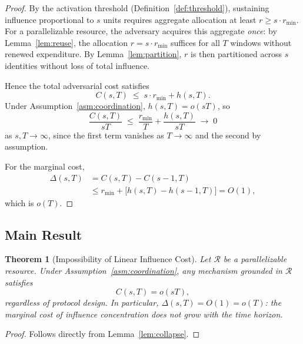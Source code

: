 \documentclass[10pt,journal,compsoc]{IEEEtran}
\newtheorem{theorem}{Theorem}[section]
\theoremstyle{remark}
\begin{document}
	\begin{proof}
		By the activation threshold (Definition~\ref{def:threshold}),
		sustaining influence proportional to $s$ units requires
		aggregate allocation at least $r \geq s \cdot r_{\min}$.
		For a parallelizable resource, the adversary acquires
		this aggregate \emph{once}: by
		Lemma~\ref{lem:reuse}, the allocation $r = s \cdot r_{\min}$
		suffices for all $T$ windows without renewed expenditure.
		By Lemma~\ref{lem:partition}, $r$ is then partitioned
		across $s$ identities without loss of total influence.
		
		Hence the total adversarial cost satisfies
		\begin{equation}
			C(s, T) \;\leq\; s \cdot r_{\min} + h(s, T).
		\end{equation}
		Under Assumption~\ref{asm:coordination},
		$h(s, T) = o(sT)$, so
		\begin{equation}
			\frac{C(s, T)}{sT}
			\;\leq\;
			\frac{r_{\min}}{T} + \frac{h(s, T)}{sT}
			\;\to\; 0
		\end{equation}
		as $s, T \to \infty$, since the first term vanishes as
		$T \to \infty$ and the second by assumption.
		
		For the marginal cost,
		\begin{align}
			\Delta(s, T)
			&= C(s,T) - C(s-1,T) \nonumber \\
			&\leq r_{\min} + \bigl[h(s,T) - h(s-1,T)\bigr]
			= O(1),
		\end{align}
		which is $o(T)$.
	\end{proof}
	
	\subsection{Main Result}
	\label{ssec:theorem_impossible}
	
	\begin{theorem}[Impossibility of Linear Influence Cost]
		\label{thm:impossible}
		Let $\mathcal{R}$ be a parallelizable resource.
		Under Assumption~\ref{asm:coordination}, any mechanism
		grounded in $\mathcal{R}$ satisfies
		\begin{equation}
			C(s, T) = o(sT),
		\end{equation}
		regardless of protocol design.
		In particular, $\Delta(s, T) = O(1) = o(T)$: the
		marginal cost of influence concentration does not
		grow with the time horizon.
	\end{theorem}
	
	\begin{proof}
		Follows directly from Lemma~\ref{lem:collapse}.
	\end{proof}
	
\end{document}
